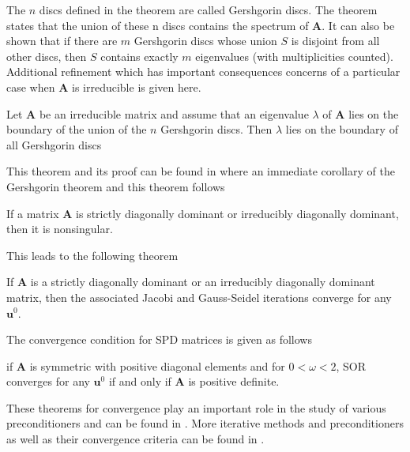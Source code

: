The $n$ discs defined in the theorem are called Gershgorin discs. The theorem states that the union of these n discs contains the spectrum of $\boldsymbol{A}$. It can also be shown that if there are $m$ Gershgorin discs whose union $S$ is disjoint from all other discs, then $S$ contains exactly $m$ eigenvalues (with multiplicities counted). 
Additional refinement which has important consequences concerns of a particular case when $\boldsymbol{A}$ is irreducible is given here.
\begin{theorem}
Let $\boldsymbol{A}$ be an irreducible matrix and assume that an eigenvalue $\lambda$ of $\boldsymbol{A}$ lies on the boundary of the union of the $n$ Gershgorin discs. Then $\lambda$ lies on the boundary of all Gershgorin discs
\end{theorem}
This theorem and its proof can be found in \cite{doi:10.1137/1.9780898718003} where an immediate corollary of the Gershgorin theorem and this theorem follows
\begin{corollary}
If a matrix $\boldsymbol{A}$ is strictly diagonally dominant or irreducibly diagonally dominant, then it is nonsingular.
\end{corollary}
This leads to the following theorem
\begin{theorem}
If $\boldsymbol{A}$ is a strictly diagonally dominant or an irreducibly diagonally dominant matrix, then the associated Jacobi and Gauss-Seidel iterations converge for any $\boldsymbol{u}^0$.
\end{theorem}
The convergence condition for SPD matrices is given as follows
\begin{theorem}
if $\boldsymbol{A}$ is symmetric with positive diagonal elements and for $0 < \omega < 2$, SOR converges for any $\boldsymbol{u}^0$ if and only if $\boldsymbol{A}$ is positive definite. 
\end{theorem}
These theorems for convergence play an important role in the study of various preconditioners and can be found in \cite{doi:10.1137/1.9780898718003}.
More iterative methods and preconditioners as well as their convergence criteria can be found in \cite{doi:10.1137/1.9780898718003}.